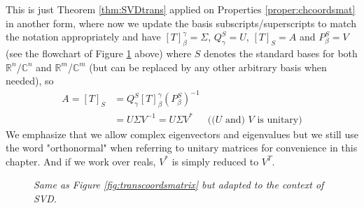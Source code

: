This is just Theorem \ref{thm:SVDtrans} applied on Properties \ref{proper:chcoordsmat} in another form, where now we update the basis subscripts/superscripts to match the notation appropriately and have $[T]^{\gamma}_{\beta} = \Sigma$, $Q_{\gamma}^{S} = U$, $[T]_{S} = A$ and $P_{\beta}^{S} = V$ (see the flowchart of Figure \ref{fig:transcoordSVD} above) where $S$ denotes the standard bases for both $\mathbb{R}^n$/$\mathbb{C}^n$ and $\mathbb{R}^m$/$\mathbb{C}^m$ (but can be replaced by any other arbitrary basis when needed), so
\begin{align*}
A = [T]_S &= Q_{\gamma}^{S}[T]^{\gamma}_{\beta}(P_{\beta}^{S})^{-1} \\
&= U\Sigma V^{-1} = U\Sigma V^* & \text{(($U$ and) $V$ is unitary)}
\end{align*}
We emphasize that we allow complex eigenvectors and eigenvalues but we still use the word "orthonormal" when referring to unitary matrices for convenience in this chapter. And if we work over reals, $V^*$ is simply reduced to $V^T$.

\begin{figure}
    \centering
    \caption{\textit{Same as Figure \ref{fig:transcoordsmatrix} but adapted to the context of SVD.}}
    \label{fig:transcoordSVD}
\end{figure}

